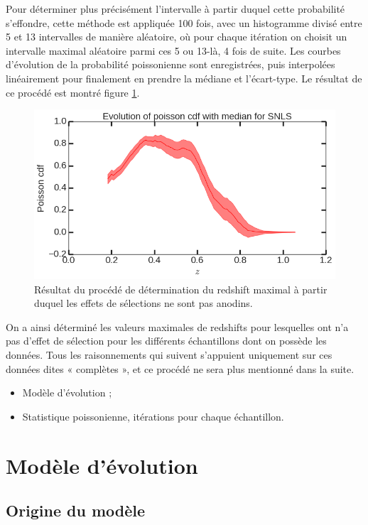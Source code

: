 \documentclass[a4paper, 12pt, svgnames]{article}
\begin{document}
Pour déterminer plus précisément l'intervalle à partir duquel cette probabilité
s'effondre, cette méthode est appliquée 100 fois, avec un histogramme divisé
entre 5 et 13 intervalles de manière aléatoire, où pour chaque itération on
choisit un intervalle maximal aléatoire parmi ces 5 ou 13-là, 4 fois de suite.
Les courbes d'évolution de la probabilité poissonienne sont enregistrées, puis
interpolées linéairement pour finalement en prendre la médiane et l'écart-type.
Le résultat de ce procédé est montré figure \ref{zmax_result}.

\begin{figure}[htbp!]
    \centering
    \includegraphics[width=.5\linewidth]{Rapport_figures/zmax_result.png}
    \captionsetup{justification=centering}
    \caption{Résultat du procédé de détermination du redshift maximal à partir
    duquel les effets de sélections ne sont pas anodins.}
    \label{zmax_result}
\end{figure}

On a ainsi déterminé les valeurs maximales de redshifts pour lesquelles ont n'a
pas d'effet de sélection pour les différents échantillons dont on possède les
données. Tous les raisonnements qui suivent s'appuient uniquement sur ces
données dites « complètes », et ce procédé ne sera plus mentionné dans la suite.

\begin{itemize}
    \item Modèle d'évolution ;
    \item Statistique poissonienne, itérations pour chaque échantillon.
\end{itemize}

\section{Modèle d'évolution}\label{sec:stretchevol}
\subsection{Origine du modèle}\label{ssec:stretchevol_ori}
\end{document}
